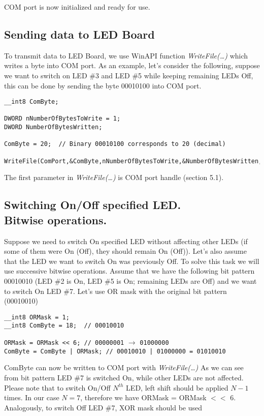 \documentclass{article}
\begin{document}
COM port is now initialized and ready for use.

\subsection{Sending data to LED Board}

To transmit data to LED Board, we use WinAPI function
\emph{WriteFile(\ldots)} which writes a byte into COM port. As an
example, let's consider the following, suppose we want to switch on
LED \#3 and LED \#5 while keeping remaining LEDs Off, this can be
done by sending the byte 00010100 into COM port.

\begin{verbatim}
__int8 ComByte;

DWORD nNumberOfBytesToWrite = 1;
DWORD NumberOfBytesWritten;

ComByte = 20;  // Binary 00010100 corresponds to 20 (decimal)

WriteFile(ComPort,&ComByte,nNumberOfBytesToWrite,&NumberOfBytesWritten,NULL);
\end{verbatim}
The first parameter in \emph{WriteFile(\ldots)} is COM port handle
(section 5.1).
\subsection{Switching On/Off specified LED.\\ Bitwise operations.}
Suppose we need to switch On specified LED without affecting other
LEDs (if some of them were On (Off), they should remain On (Off)).
Let's also assume that the LED we want to switch On was previously
Off. To solve this task we will use successive bitwise operations.
Assume that we have the following bit pattern 00010010 (LED \#2 is
On, LED \#5 is On; remaining LEDs are Off) and we want to switch On
LED \#7. Let's use OR mask with the original bit pattern (00010010)
\begin {verbatim}
__int8 ORMask = 1;
__int8 ComByte = 18;  // 00010010
\end{verbatim}
\verb"ORMask = ORMask << 6; // 00000001" $\longrightarrow$
\verb"01000000"\\
\verb"ComByte = ComByte | ORMask; // 00010010 | 01000000 = 01010010"

\vspace*{0.4cm}

ComByte can now be written to COM port with \emph{WriteFile(\ldots)}
As we can see from bit pattern LED \#7 is switched On, while other
LEDs are not affected. Please note that to switch On/Off $N^{th}$
LED, left shift should be applied $N-1$ times. In our case $N=7$,
therefore we have ORMask = ORMask $<<$ 6. Analogously, to switch Off
LED \#7, XOR mask should be used
\end{document}

